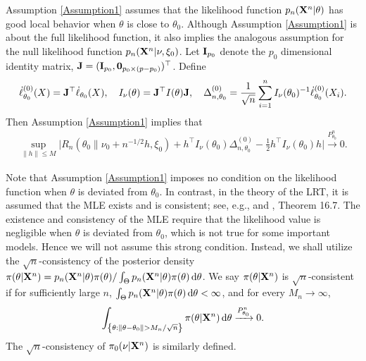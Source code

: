 \documentclass[11pt]{article}
\theoremstyle{plain}
\theoremstyle{definition}
\theoremstyle{remark}
\begin{document}
Assumption \ref{Assumption1} assumes that the likelihood function $p_n (\mathbf{X}^n | \theta)$ has good local behavior when $\theta$ is close to $\theta_0$.
Although Assumption \ref{Assumption1} is about the full likelihood function, it also implies the analogous assumption for the null likelihood function $p_n (\mathbf{X}^n |\nu, \xi_0)$.
Let 
$\mathbf{I}_{p_0}$ denote the $p_0$ dimensional identity matrix,
$\mathbf{J}=(\mathbf{I}_{p_0},\mathbf{0}_{p_0\times(p-p_0)})^\top $.
Define
$$
\dot{\ell}_{\theta_0}^{(0)}(X)= \mathbf{J}^\top \dot \ell_{\theta_0}(X)
,
\quad 
I_\nu(\theta)=\mathbf{J}^\top I(\theta) \mathbf{J},\quad 
\Delta_{n,\theta_0}^{(0)}
=\frac{1}{\sqrt{n}}\sum_{i=1}^n I_\nu(\theta_0)^{-1}\dot{\ell}^{(0)}_{\theta_0}(X_i)
.
$$
Then  Assumption \ref{Assumption1} implies that
\begin{align*}
        \sup_{\|h\|\leq M}\Big|
        R_n( \theta_0\|\nu_0 + n^{-1/2 }h, \xi_0 )
        +h^\top  I_{\nu}(\theta_0)\Delta_{n,\theta_0}^{(0)}-\frac{1}{2}h^\top  I_\nu (\theta_0) h
        \Big|\xrightarrow{P^n_{\theta_0}}0.
\end{align*}


Note that Assumption \ref{Assumption1} imposes no condition on the likelihood function when $\theta$ is deviated from $\theta_0$.
In contrast, in the theory of the LRT, it is assumed that the MLE exists and is consistent; see, e.g., \cite{Wilks1938The} and \cite{van2000asymptotic}, Theorem 16.7.
The existence and consistency of the MLE require that the likelihood value is negligible when $\theta$ is deviated from $\theta_0$, which is not true for some important models.
Hence we will not assume this strong condition.
Instead, we shall utilize the $\sqrt n$-consistency of the posterior density $\pi(\theta | \mathbf{X}^n) = p_n (\mathbf{X}^n | \theta) \pi (\theta ) / \int_{\Theta} p_n (\mathbf{X}^n | \theta) \pi (\theta) \, \mathrm d \theta $.
We say $\pi(\theta | \mathbf{X}^n)$ is $\sqrt n$-consistent if for sufficiently large $n$, $\int_{\Theta} p_n (\mathbf{X}^n | \theta) \pi (\theta) \, \mathrm d \theta < \infty$, and for every $M_n \to \infty$,
\begin{align*}
\int_{ \left\{ \theta: \|\theta - \theta_0\| > M_n / \sqrt n \right\}}\pi(\theta | \mathbf{X}^n) \, \mathrm d \theta \xrightarrow{P_{\theta_0}^n} 0.
\end{align*}
    The $\sqrt{n}$-consistency of $\pi_0(\nu | \mathbf{X}^{n})$ is similarly defined.
\end{document}
